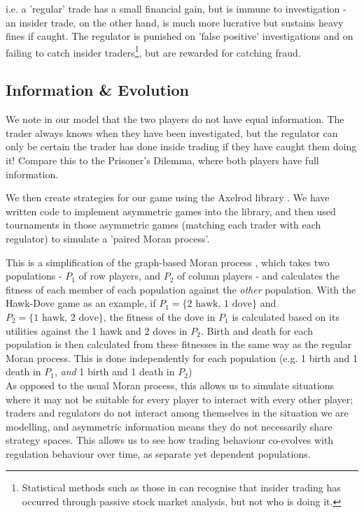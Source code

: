 \documentclass{article}
\begin{document}
i.e. a 'regular' trade has a small financial gain, but is immune to investigation - an insider trade, on the other hand, is much more lucrative but sustains heavy fines if caught. The regulator is punished on 'false positive' investigations and on failing to catch insider traders\footnote[2]{Statistical methods such as those in \citet{bris2005insider} can recognise that insider trading has occurred through passive stock market analysis, but not who is doing it.}, but are rewarded for catching fraud. 

\subsection{Information \& Evolution}
We note in our model that the two players do not have equal information. The trader always knows when they have been investigated, but the regulator can only be certain the trader has done inside trading if they have caught them doing it! Compare this to the Prisoner's Dilemma, where both players have full information.

We then create strategies for our game using the Axelrod library \citep{axelrodproject}. We have written code to implement asymmetric games into the library, and then used tournaments in those asymmetric games (matching each trader with each regulator) to simulate a 'paired Moran process'. 

This is a simplification of the graph-based Moran process \citep{shakarian2013novel}, which takes two populations - $P_1$ of row players, and $P_2$ of column players - and calculates the fitness of each member of each population against the \emph{other} population. With the Hawk-Dove game as an example, if $P_1 = \{\text{2 hawk, 1 dove}\}$ and $P_2 = \{\text{1 hawk, 2 dove}\}$, the fitness of the dove in $P_1$ is calculated based on its utilities against the 1 hawk and 2 doves in $P_2$. Birth and death for each population is then calculated from these fitnesses in the same way as the regular Moran process. This is done independently for each population (e.g. 1 birth and 1 death in $P_1$, \emph{and} 1 birth and 1 death in $P_2$)
\\

As opposed to the usual Moran process, this allows us to simulate situations where it may not be suitable for every player to interact with every other player; traders and regulators do not interact among themselves in the situation we are modelling, and asymmetric information means they do not necessarily share strategy spaces. This allows us to see how trading behaviour co-evolves with regulation behaviour over time, as separate yet dependent populations.
\end{document}
